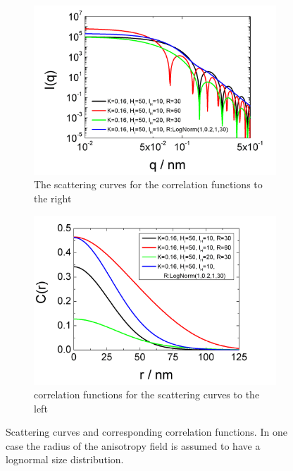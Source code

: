 \begin{figure}[htb]

\begin{subfigure}[b]{0.48\textwidth}
   \centering
   \includegraphics[width=\textwidth]{../images/form_factor/magnetic/IQ4spinmisalignment.png}
   \caption{The scattering curves for the correlation functions to the right}
   \label{fig:MagSpinMisAlignment1}
\end{subfigure}
\hfill
\begin{subfigure}[b]{0.48\textwidth}
   \centering
   \includegraphics[width=\textwidth]{../images/form_factor/magnetic/correlation4spinmisalignment.png}
   \caption{correlation functions for the scattering curves to the left}
   \label{fig:MagSpinMisAlignment2}
\end{subfigure}
\caption{Scattering curves and corresponding correlation functions.
In one case the radius of the anisotropy field is assumed to have a
lognormal size distribution.} \label{fig:MagSpinMisAlignment}
\end{figure}


